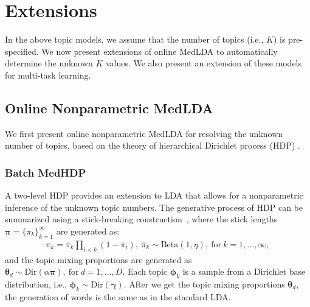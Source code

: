\documentclass[twoside,11pt]{article}
\newcommand{\thetav}{\bm{\theta}}
\newcommand{\piv}{\bm \pi}
\begin{document}
\section{Extensions}\label{sec:extensions}
In the above topic models, we assume that the number of topics (i.e., $K$) is pre-specified. We now present extensions of online MedLDA to automatically determine the unknown $K$ values. We also present an extension of these models for multi-task learning.

\subsection{Online Nonparametric MedLDA}\label{sec:ohdp}

We first present online nonparametric MedLDA for resolving the unknown number of topics, based on the theory of hierarchical Dirichlet process (HDP) \citep{teh2006hierarchical}.

\subsubsection{Batch MedHDP} \label{sec:medhdp}

A two-level HDP provides an extension to LDA that allows for a nonparametric inference of the unknown topic numbers. The generative process of HDP can be summarized using a stick-breaking construction~\citep{wang2012truncation}, where the stick lengths $\bm{\pi} = \{\pi_k\}_{k = 1}^{\infty}$ are generated as:
%
\begin{equation*}
\begin{array}{l}
\pi_k = \bar{\pi}_k \prod\limits_{i < k}(1-\bar{\pi}_{i}), ~ \bar{\pi}_k \sim \text{Beta}(1,\eta),~ \textrm{for}~k=1, ..., \infty,
\end{array}
\end{equation*}
%
and the topic mixing proportions are generated as $\thetav_d \sim \text{Dir}(\alpha \piv),~\textrm{for}~d = 1,...,D$. Each topic $\bm{\phi}_k$ is a sample from a Dirichlet base distribution, i.e., $\bm{\phi}_k \sim \text{Dir}(\bm{\gamma})$. After we get the topic mixing proportions $\thetav_d$, the generation of words is the same as in the standard LDA.
\end{document}

